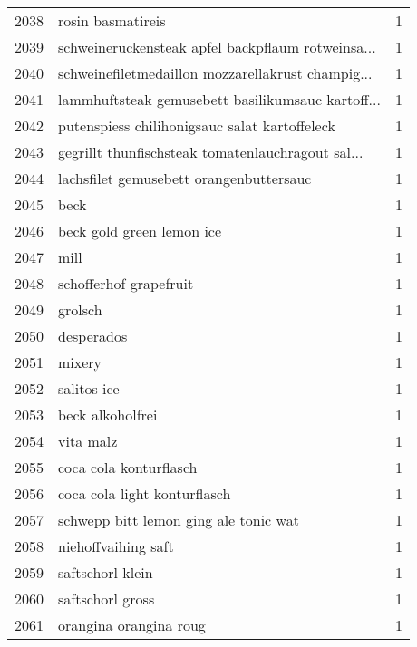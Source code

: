 \begin{tabular}{llr}
2038 &                                  rosin basmatireis &      1 \\
2039 &  schweineruckensteak apfel backpflaum rotweinsa... &      1 \\
2040 &  schweinefiletmedaillon mozzarellakrust champig... &      1 \\
2041 &  lammhuftsteak gemusebett basilikumsauc kartoff... &      1 \\
2042 &      putenspiess chilihonigsauc salat kartoffeleck &      1 \\
2043 &  gegrillt thunfischsteak tomatenlauchragout sal... &      1 \\
2044 &            lachsfilet gemusebett orangenbuttersauc &      1 \\
2045 &                                               beck &      1 \\
2046 &                          beck gold green lemon ice &      1 \\
2047 &                                               mill &      1 \\
2048 &                             schofferhof grapefruit &      1 \\
2049 &                                            grolsch &      1 \\
2050 &                                         desperados &      1 \\
2051 &                                             mixery &      1 \\
2052 &                                        salitos ice &      1 \\
2053 &                                   beck alkoholfrei &      1 \\
2054 &                                          vita malz &      1 \\
2055 &                             coca cola konturflasch &      1 \\
2056 &                       coca cola light konturflasch &      1 \\
2057 &              schwepp bitt lemon ging ale tonic wat &      1 \\
2058 &                                niehoffvaihing saft &      1 \\
2059 &                                   saftschorl klein &      1 \\
2060 &                                   saftschorl gross &      1 \\
2061 &                             orangina orangina roug &      1 \\

\end{tabular}

